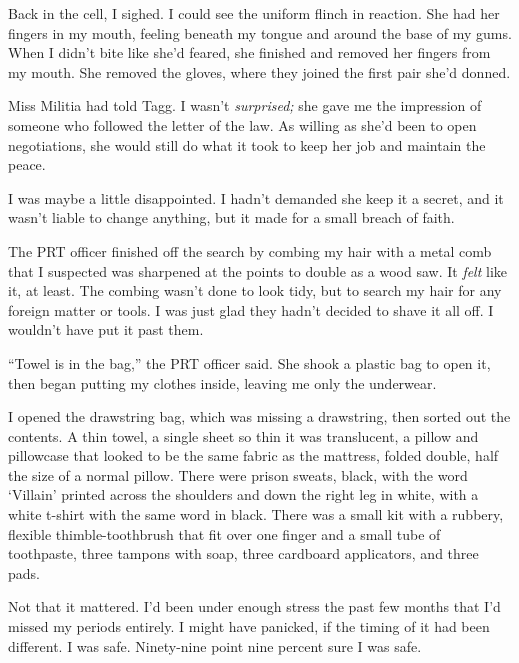 Back in the cell, I sighed.  I could see the uniform flinch in reaction.  She had her fingers in my mouth, feeling beneath my tongue and around the base of my gums.  When I didn't bite like she'd feared, she finished and removed her fingers from my mouth.  She removed the gloves, where they joined the first pair she'd donned.



Miss Militia had told Tagg.  I wasn't \emph{surprised; }she gave me the impression of someone who followed the letter of the law.  As willing as she'd been to open negotiations, she would still do what it took to keep her job and maintain the peace.



I was maybe a little disappointed.  I hadn't demanded she keep it a secret, and it wasn't liable to change anything, but it made for a small breach of faith.



The PRT officer finished off the search by combing my hair with a metal comb that I suspected was sharpened at the points to double as a wood saw.  It \emph{felt} like it, at least.  The combing wasn't done to look tidy, but to search my hair for any foreign matter or tools.  I was just glad they hadn't decided to shave it all off.  I wouldn't have put it past them.



``Towel is in the bag,'' the PRT officer said.  She shook a plastic bag to open it, then began putting my clothes inside, leaving me only the underwear.



I opened the drawstring bag, which was missing a drawstring, then sorted out the contents.  A thin towel, a single sheet so thin it was translucent, a pillow and pillowcase that looked to be the same fabric as the mattress, folded double, half the size of a normal pillow.  There were prison sweats, black, with the word `Villain' printed across the shoulders and down the right leg in white, with a white t-shirt with the same word in black.  There was a small kit with a rubbery, flexible thimble-toothbrush that fit over one finger and a small tube of toothpaste, three tampons with soap, three cardboard applicators, and three pads.



Not that it mattered.  I'd been under enough stress the past few months that I'd missed my periods entirely.  I might have panicked, if the timing of it had been different.  I was safe.  Ninety-nine point nine percent sure I was safe.



